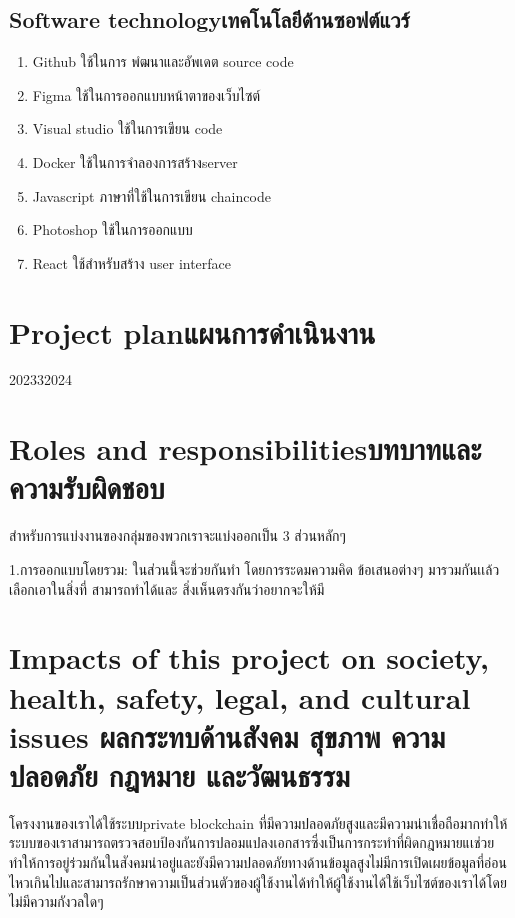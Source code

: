 \subsection{\ifenglish Software technology\else เทคโนโลยีด้านซอฟต์แวร์\fi}
\begin{enumerate}
    \item Github ใช้ในการ พํฒนาและอัพเดต source code 
    \item Figma  ใช้ในการออกแบบหน้าตาของเว็บไซต์
    \item Visual studio ใช้ในการเขียน code
    \item Docker ใช้ในการจำลองการสร้างserver 
    \item Javascript ภาษาที่ใช้ในการเขียน chaincode 
    \item Photoshop ใช้ในการออกแบบ
    \item React ใช้สำหรับสร้าง user interface
\end{enumerate}
\section{\ifenglish Project plan\else แผนการดำเนินงาน\fi}

\begin{plan}{10}{2023}{3}{2024}
\end{plan}

\section{\ifenglish Roles and responsibilities\else บทบาทและความรับผิดชอบ\fi}
สำหรับการแบ่งงานของกลุ่มของพวกเราจะแบ่งออกเป็น 3 ส่วนหลักๆ

1.การออกแบบโดยรวม: ในส่วนนี้จะช่วยกันทำ โดยการระดมความคิด ข้อเสนอต่างๆ มารวมกันเเล้วเลือกเอาในสิ่งที่ สามารถทำได้และ สิ่งเห็นตรงกันว่าอยากจะให้มี

\section{\ifenglish%
Impacts of this project on society, health, safety, legal, and cultural issues
\else%
ผลกระทบด้านสังคม สุขภาพ ความปลอดภัย กฎหมาย และวัฒนธรรม
\fi}
\enskip \enskip \enskip \enskip \enskip 
โครงงานของเราได้ใช้ระบบprivate blockchain ที่มีความปลอดภัยสูงและมีความน่าเชื่อถือมากทำให้ระบบของเราสามารถตรวจสอบป้องกันการปลอมแปลงเอกสารซึ่งเป็นการกระทำที่ผิดกฎหมายแเช่วยทำให้การอยู่ร่วมกันในสังคมน่าอยู่และยังมีความปลอดภัยทางด้านข้อมูลสูงไม่มีการเปิดเผยข้อมูลที่อ่อนไหวเกินไปและสามารถรักษาความเป็นส่วนตัวของผู้ใช้งานได้ทำให้ผู้ใช้งานได้ใช้เว็บไซต์ของเราได้โดยไม่มีความกังวลใดๆ






